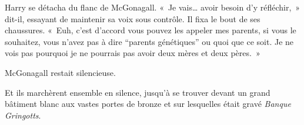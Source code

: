 Harry se détacha du flanc de McGonagall. «~Je vais… avoir besoin d'y réfléchir,~» dit-il, essayant de maintenir sa voix sous contrôle. Il fixa le bout de ses chaussures. «~Euh, c'est d'accord vous pouvez les appeler mes parents, si vous le souhaitez, vous n'avez pas à dire ``parents génétiques'' ou quoi que ce soit. Je ne vois pas pourquoi je ne pourrais pas avoir deux mères et deux pères.~»

McGonagall restait silencieuse.

Et ils marchèrent ensemble en silence, jusqu'à se trouver devant un grand bâtiment blanc aux vastes portes de bronze et sur lesquelles était gravé \emph{Banque Gringotts}.
